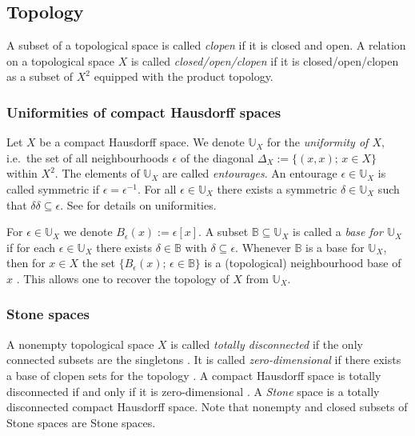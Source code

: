 \documentclass[12pt, reqno]{amsart}
\theoremstyle{definition}
\theoremstyle{remark}
\numberwithin{equation}{section}
\theoremstyle{theorem}
\theoremstyle{remark}
\begin{document}
\subsection{Topology}
\label{subsec:prelims_topology}
A subset of a topological space is called \emph{clopen} if it is closed and open. A relation on a topological space $X$ is called \emph{closed/open/clopen} if it is closed/open/clopen as a subset of $X^2$ equipped with the product topology. 

\subsubsection{Uniformities of compact Hausdorff spaces}
\label{subsubsec:prelims_topology_UniformitiesOfCompactHausdorffSpaces}
Let $X$ be a compact Hausdorff space. 
We denote $\mathbb{U}_X$ for the \emph{uniformity of $X$}, i.e.\ the set of all neighbourhoods $\epsilon$ of the diagonal $\Delta_X:=\{(x,x);\, x\in X\}$ within $X^2$. 
The elements of $\mathbb{U}_X$ are called \emph{entourages}. 
An entourage $\epsilon\in \mathbb{U}_X$ is called symmetric if $\epsilon=\epsilon^{-1}$.
For all $\epsilon\in \mathbb{U}_X$ there exists a symmetric $\delta\in \mathbb{U}_X$ such that $\delta\delta\subseteq \epsilon$. 
See \cite[Chapter 6]{kelley2017general} for details on uniformities. 

For $\epsilon\in \mathbb{U}_X$ we denote $B_\epsilon(x):=\epsilon[x]$. 
A subset $\mathbb{B}\subseteq \mathbb{U}_X$ is called a \emph{base for $\mathbb{U}_X$} if for each $\epsilon\in \mathbb{U}_X$ there exists $\delta\in \mathbb{B}$ with $\delta\subseteq \epsilon$. 
Whenever $\mathbb{B}$ is a base for $\mathbb{U}_X$, then for $x\in X$ the set $\{B_\epsilon(x);\, \epsilon\in \mathbb{B}\}$ is a (topological) neighbourhood base of $x$ \cite[Corollary 30]{kelley2017general}. This allows one to recover the topology of $X$ from $\mathbb{U}_X$. 

\subsubsection{Stone spaces}
\label{subsubsec:prelims_topology_StoneSpaces}
A nonempty topological space $X$ is called \emph{totally disconnected} if the only connected subsets are the singletons \cite[Page~101]{illanes1999hyperspaces}.
It is called \emph{zero-dimensional} if there exists a base of clopen sets for the topology \cite[Page~64]{illanes1999hyperspaces}. 
A compact Hausdorff space is totally disconnected if and only if it is zero-dimensional \cite[Theorem 12.11]{illanes1999hyperspaces}.
A \emph{Stone} space is a totally disconnected compact Hausdorff space. 
Note that nonempty and closed subsets of Stone spaces are Stone spaces. 
\end{document}
